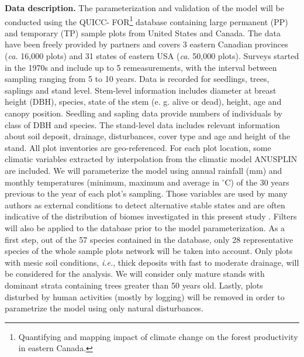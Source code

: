 \textbf{Data description.} The parameterization and validation of the model
will be conducted using the QUICC- FOR\footnote{Quantifying and mapping impact
of climate change on the forest productivity in eastern Canada.} database
containing large permanent (PP) and temporary (TP) sample plots from United
States and Canada. The data have been freely provided by partners and covers 3
eastern Canadian provinces (\textit{ca.} 16,000 plots) and 31 states of
eastern USA (\textit{ca.} 50,000 plots). Surveys started in the 1970s and
include up to 5 remeasurements, with the interval between sampling ranging
from 5 to 10 years. Data is recorded for seedlings, trees, saplings and stand
level. Stem-level information includes diameter at breast height (DBH),
species, state of the stem (e. g. alive or dead), height, age and canopy
position. Seedling and sapling data provide numbers of individuals by class of
DBH and species. The stand-level data includes relevant information about
soil deposit, drainage, disturbances, cover type and age and height of the
stand. All plot inventories are geo-referenced. For each plot location, some
climatic variables extracted by interpolation from the climatic
model ANUSPLIN \cite{McKenney2011} are included. We will parameterize the model using
annual rainfall (mm) and monthly temperatures (minimum, maximum and average in
\ensuremath{^\circ}C) of the 30 years previous to the year of each plot's sampling.
Those variables are used by many authors as external conditions to detect
alternative stable states and are often indicative of the distribution of
biomes investigated in this present study
\cite{Goldblum2010,Hirota2011,Scheffer2012}. Filters will also be applied to the
database prior to the model parameterization. As a first step, out of the 57
species contained in the database, only 28 representative species of the
whole sample plots network will be taken into account. Only plots with mesic
soil conditions, \textit{i.e.}, thick deposits with fast to moderate drainage,
will be considered for the analysis. We will consider only mature stands
with dominant strata containing trees greater than 50 years old. Lastly, plots
disturbed by human activities (mostly by logging) will be removed in order to
parametrize the model using only natural disturbances. \\


